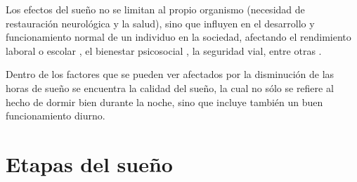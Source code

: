 Los efectos del sue\~no no se limitan al propio organismo (necesidad de restauración neurol\'ogica
y la salud), sino que influyen en el desarrollo y funcionamiento normal de un individuo en la 
sociedad, afectando el rendimiento laboral o escolar \cite{Sierra02,Baez05,Rosales06,Marin08}, 
el bienestar psicosocial \cite{BuelaCasal04,Vassali09,Gibson06}, la seguridad vial, entre 
otras \cite{Fontana13}.

Dentro de los factores que se pueden ver afectados por la disminuci\'on de las horas de sue\~no 
se encuentra la calidad del sue\~no, la cual no s\'olo se refiere al hecho de dormir bien durante 
la noche, sino que incluye también un buen funcionamiento diurno. 


\section{Etapas del sue\~no}

